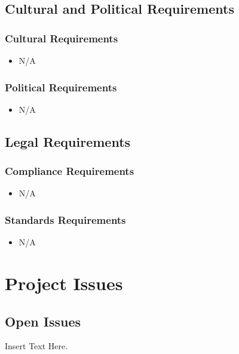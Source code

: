 \documentclass [12pt]{article}
\begin{document}
\subsection{\large Cultural and Political Requirements } 
\subsubsection{Cultural Requirements }
	\begin{itemize}
		\item N/A
	\end{itemize}

\subsubsection{Political Requirements }
	\begin{itemize}
		\item N/A
	\end{itemize}


\subsection{\large Legal Requirements}
\subsubsection{Compliance Requirements }
	\begin{itemize}
		\item N/A
	\end{itemize}
	
\subsubsection{Standards Requirements }
	\begin{itemize}
		\item N/A
	\end{itemize}



\section {Project Issues} 


\subsection{\large Open Issues}
	Insert Text Here.
\end{document}
